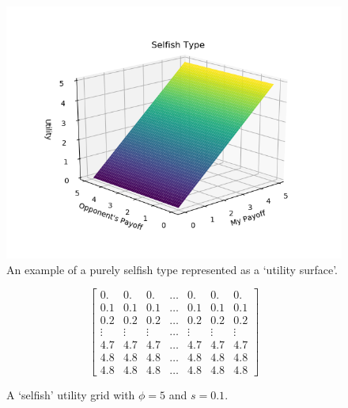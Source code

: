 \documentclass[11pt]{book}
\begin{document}
\begin{figure}
	\centering
	\includegraphics[scale=0.75]{resources/selfish.png}
	\caption{An example of a purely selfish type represented as a `utility surface'.}
	\label{selfishUtilitySurface}
\end{figure}

\begin{figure}
\[
	\begin{bmatrix} 
	0. & 0. & 0. & \dots & 0. & 0. & 0.\\
	0.1 & 0.1 & 0.1 & \dots & 0.1 & 0.1 & 0.1\\
	0.2 & 0.2 & 0.2 & \dots & 0.2 & 0.2 & 0.2\\
	\vdots & \vdots & \vdots & \dots & \vdots &\vdots &\vdots\\
	4.7 & 4.7 & 4.7 & \dots & 4.7 & 4.7 & 4.7\\
	4.8 & 4.8 & 4.8 & \dots & 4.8 & 4.8 & 4.8\\
	4.8 & 4.8 & 4.8 & \dots & 4.8 & 4.8 & 4.8 
	\end{bmatrix}
\]
\caption{A `selfish' utility grid with $\phi = 5$ and $s = 0.1$.}
\label{selfishUtilityGrid}
\end{figure}
\end{document}
